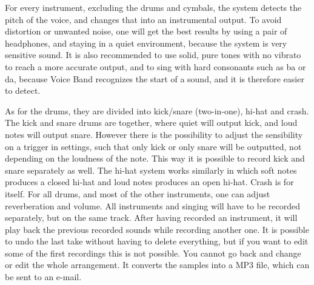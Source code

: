 For every instrument, excluding the drums and cymbals, the system detects the pitch of the voice, and changes that into an instrumental output. To avoid distortion or unwanted noise, one will get the best results by using a pair of headphones, and staying in a quiet environment, because the system is very sensitive sound. It is also recommended to use solid, pure tones with no vibrato to reach a more accurate output, and to sing with hard consonants such as ba or da, because Voice Band recognizes the start of a sound, and it is therefore easier to detect.  

As for the drums, they are divided into kick/snare (two-in-one), hi-hat and crash. The kick and snare drums are together, where quiet will output kick, and loud notes will output snare. However there is the possibility to adjust the sensibility on a trigger in settings, such that only kick or only snare will be outputted, not depending on the loudness of the note. This way it is possible to record kick and snare separately as well. The hi-hat system works similarly in which soft notes produces a closed hi-hat and loud notes produces an open hi-hat. Crash is for itself. For all drums, and most of the other instruments, one can adjust reverberation and volume. 
All instruments and singing will have to be recorded separately, but on the same track. After having recorded an instrument, it will play back the previous recorded sounds while recording another one. It is possible to undo the last take without having to delete everything, but if you want to edit some of the first recordings this is not possible.  You cannot go back and change or edit the whole arrangement. It converts the samples into a MP3 file, which can be sent to an e-mail. 

